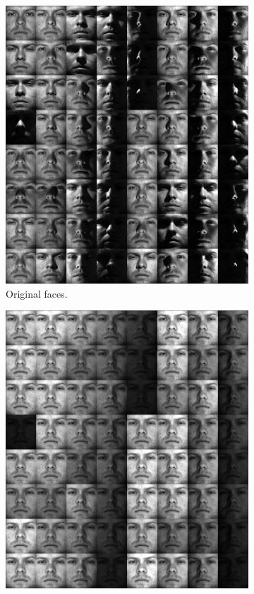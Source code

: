 \begin{figure}[t] \label{fig:rpca}
    \begin{subfigure}{.45\textwidth}
      \centering
      \includegraphics[width=\linewidth]{./figures/face.png}
      \captionsetup{justification=centering}
      \caption{Original faces.}
      \label{fig:face}
    \end{subfigure}
    \hfill
    \begin{subfigure}{.45\textwidth}
      \centering
      \includegraphics[width=\linewidth]{./figures/faceDeshadow.png}

\end{subfigure}
\end{figure}
